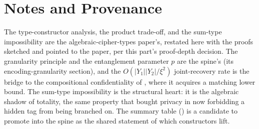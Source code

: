 \section{Notes and Provenance}
\label{sec:ch7-notes}

The type-constructor analysis, the product trade-off, and the sum-type
impossibility are the algebraic-cipher-types paper's, restated here with the
proofs sketched and pointed to the paper, per this part's proof-depth
decision. The granularity principle and the entanglement parameter $p$ are
the spine's (its encoding-granularity section), and the
$O(\lvert Y_1\rvert\lvert Y_2\rvert/\xi^2)$ joint-recovery rate is the bridge
to the compositional confidentiality of , where it
acquires a matching lower bound. The sum-type impossibility is the structural
heart: it is the algebraic shadow of totality, the same property that bought
privacy in  now forbidding a hidden tag from being
branched on. The summary table () is a candidate to
promote into the spine as the shared statement of which constructors lift.
